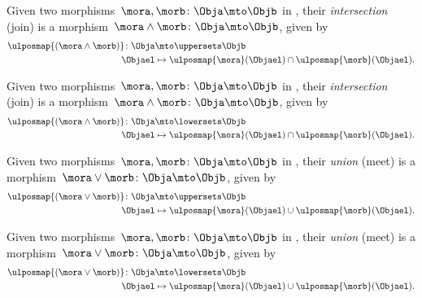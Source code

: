 \begin{definition}
Given two morphisms~$\mora,\morb\colon \Obja \mto \Objb$ in \UPos, their \emph{intersection} (join) is a morphism~$\mora \wedge \morb \colon \Obja \mto \Objb$, given by
    \begin{equation*}
        \begin{aligned}
        \ulposmap{(\mora \wedge \morb)}\colon \Obja &\mto \uppersets \Objb\\
        \Objael&\mapsto \ulposmap{\mora}(\Objael) \cap \ulposmap{\morb}(\Objael).
        \end{aligned}
    \end{equation*}
\end{definition}


\begin{definition}
Given two morphisms~$\mora,\morb\colon \Obja \mto \Objb$ in \LPos, their \emph{intersection} (join) is a morphism~$\mora \wedge \morb \colon \Obja \mto \Objb$, given by
    \begin{equation*}
        \begin{aligned}
        \ulposmap{(\mora \wedge \morb)}\colon \Obja &\mto \lowersets \Objb\\
        \Objael&\mapsto \ulposmap{\mora}(\Objael) \cap \ulposmap{\morb}(\Objael).
        \end{aligned}
    \end{equation*}
\end{definition}

\begin{definition}
Given two morphisms~$\mora,\morb\colon \Obja \mto \Objb$ in \UPos, their \emph{union} (meet) is a morphism~$\mora \vee \morb \colon \Obja \mto \Objb$, given by
    \begin{equation*}
        \begin{aligned}
        \ulposmap{(\mora \vee \morb)}\colon \Obja &\mto \uppersets \Objb\\
        \Objael&\mapsto \ulposmap{\mora}(\Objael) \cup \ulposmap{\morb}(\Objael).
        \end{aligned}
    \end{equation*}
\end{definition}

\begin{definition}
Given two morphisms~$\mora,\morb\colon \Obja \mto \Objb$ in \LPos, their \emph{union} (meet) is a morphism~$\mora \vee \morb \colon \Obja \mto \Objb$, given by
    \begin{equation*}
        \begin{aligned}
        \ulposmap{(\mora \vee \morb)}\colon \Obja &\mto \lowersets \Objb\\
        \Objael&\mapsto \ulposmap{\mora}(\Objael) \cup \ulposmap{\morb}(\Objael).
        \end{aligned}
    \end{equation*}
\end{definition}

